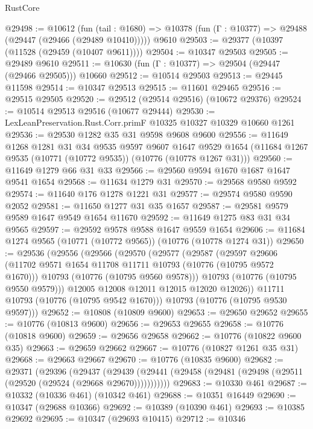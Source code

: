 \begin{lexlean}{RustCore}
\begin{coremodule}
@29498 := @10612
    (fun (tail : @1680) => @10378 (fun (Γ : @10377) => @29488 (@29447 (@29466 (@29489 @10410)))))
    @9610
@29503 := @29377 (@10397 (@11528 (@29459 (@10407 @9611))))
@29504 := @10347 @29503
@29505 := @29489 @9610
@29511 := @10630 (fun (Γ : @10377) => @29504 (@29447 (@29466 @29505))) @10660
@29512 := @10514 @29503
@29513 := @29445 @11598
@29514 := @10347 @29513
@29515 := @11601 @29465
@29516 := @29515 @29505
@29520 := @29512 (@29514 @29516) (@10672 @29376)
@29524 := @10514 @29513 @29516 (@10677 @29444)
@29530 := LexLeanPreservation.Rust.Corr.primF @10325 @10327 @10329 @10660 @1261
@29536 := @29530 @1282 @35 @31 @9598 @9608 @9600
@29556 := @11649
    @1268
    @1281
    @31
    @34
    @9535
    @9597
    @9607
    @1647
    @9529
    @1654
    (@11684 @1267 @9535 (@10771 (@10772 @9535)) (@10776 (@10778 @1267 @31)))
@29560 := @11649 @1279 @66 @31 @33
@29566 := @29560 @9594 @1670 @1687 @1647 @9541 @1654
@29568 := @11634 @1279 @31
@29570 := @29568 @9580 @9592
@29574 := @11640 @176 @1278 @1221 @31
@29577 := @29574 @9580 @9590 @2052
@29581 := @11650 @1277 @31 @35 @1657
@29587 := @29581 @9579 @9589 @1647 @9549 @1654 @11670
@29592 := @11649 @1275 @83 @31 @34 @9565
@29597 := @29592 @9578 @9588 @1647 @9559 @1654
@29606 := @11684 @1274 @9565 (@10771 (@10772 @9565)) (@10776 (@10778 @1274 @31))
@29650 := @29536
    (@29556
      (@29566
        (@29570
          (@29577
            (@29587
              (@29597
                @29606
                (@11702 @9571 @1654 @11708 @11711 @10793 (@10776 (@10795 @9572 @1670)))
                @10793
                (@10776 (@10795 @9560 @9578)))
              @10793
              (@10776 (@10795 @9550 @9579)))
            @12005
            @12008
            @12011
            @12015
            @12020
            @12026))
        @11711
        @10793
        (@10776 (@10795 @9542 @1670)))
      @10793
      (@10776 (@10795 @9530 @9597)))
@29652 := @10808 (@10809 @9600)
@29653 := @29650 @29652
@29655 := @10776 (@10813 @9600)
@29656 := @29653 @29655
@29658 := @10776 (@10818 @9600)
@29659 := @29656 @29658
@29662 := @10776 (@10822 @9600 @35)
@29663 := @29659 @29662
@29667 := @10776 (@10827 @1261 @35 @31)
@29668 := @29663 @29667
@29670 := @10776 (@10835 @9600)
@29682 := @29371
    (@29396
      (@29437
        (@29439 (@29441 (@29458 (@29481 (@29498 (@29511 (@29520 (@29524 (@29668 @29670)))))))))))
@29683 := @10330 @461
@29687 := @10332 (@10336 @461) (@10342 @461)
@29688 := @10351 @16449
@29690 := @10347 (@29688 @10366)
@29692 := @10389 (@10390 @461)
@29693 := @10385 @29692
@29695 := @10347 (@29693 @10415)
@29712 := @10346

\end{coremodule}
\end{lexlean}
